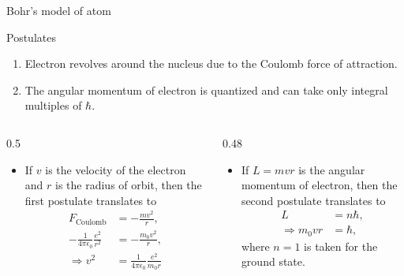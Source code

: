 \begin{frame}{Bohr's model of  atom}
	\begin{block}{Postulates}
		\begin{enumerate}
			\item Electron revolves around the nucleus due to the Coulomb force of attraction.
			\item The angular momentum of electron is quantized and can take only integral multiples of \(\hbar\).
		\end{enumerate}
	\end{block}
	\vspace{-2em}
\begin{columns}
	\begin{column}[t]{0.5\textwidth}
				\begin{itemize}
		\item If \(v\) is the velocity of the electron and \(r\) is the radius of orbit, then the first postulate translates to
		\begin{align*}
			F_\text{Coulomb} &= - \frac{m v^2}{r}, 	\\
			- \frac{1}{4 \pi \epsilon_0} \frac{e^2}{r^2} &= - \frac{m_0 v^2}{r}, \\
			\Rightarrow v^2 &= \frac{1}{4 \pi \epsilon_0} \frac{e^2}{m_0r}
		\end{align*}
	\end{itemize}
	\end{column}
	\begin{column}[t]{0.48\textwidth}
			\begin{itemize}
			\item If \(L = mvr\) is the angular momentum of electron, then the second postulate translates to 
			\begin{align*}
				L &= n \hbar, \\
				\Rightarrow m_0vr &= \hbar,
			\end{align*}
			where \(n=1\) is taken for the ground state.
		\end{itemize}
	\end{column}
\end{columns}
\end{frame}
%
